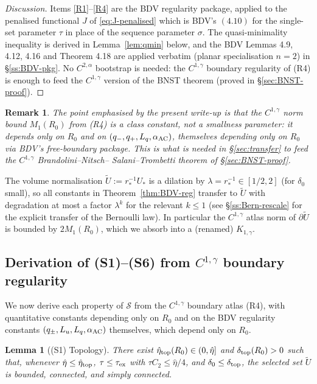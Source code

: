 \documentclass[11pt]{amsart}
\newtheorem{lemma}[theorem]{Lemma}
\newtheorem{remark}[theorem]{Remark}
\newcommand{\Sclass}{\mathcal S}
\newcommand{\wt}{\widetilde}
\begin{document}
\begin{proof}[Discussion]
Items \ref{R1}--\ref{R4} are the BDV regularity package, applied to
the penalised functional $J$ of \eqref{eq:J-penalised} which is BDV's
$(4.10)$ for the single-set parameter $\tau$ in place of the
sequence parameter $\sigma$.  The quasi-minimality inequality is
derived in Lemma~\ref{lem:qmin} below, and the BDV Lemmas 4.9, 4.12,
4.16 and Theorem 4.18 are applied verbatim (planar specialisation
$n=2$) in \S\ref{ss:BDV-pkg}.  No $C^{2,\alpha}$ bootstrap is needed:
the $C^{1,\gamma}$ boundary regularity of (R4) is enough to feed the
$C^{1,\gamma}$ version of the BNST theorem (proved in
\S\ref{sec:BNST-proof}).
\end{proof}

\begin{remark}
The point emphasised by the present write-up is that the
$C^{1,\gamma}$ norm bound $M_1(R_0)$ from (R4) is a \emph{class
constant}, not a smallness parameter: it depends only on $R_0$ and
on $(q_-,q_+,L_q,\alpha_{\rm AC})$, themselves depending only on
$R_0$ via BDV's free-boundary package.  This is what is needed in
\S\ref{sec:transfer} to feed the $C^{1,\gamma}$ Brandolini--Nitsch--
Salani--Trombetti theorem of \S\ref{sec:BNST-proof}.
\end{remark}

The volume normalisation $\wt U:=r_*^{-1}U_*$ is a dilation by
$\lambda=r_*^{-1}\in[1/2,2]$ (for $\delta_0$ small), so all
constants in Theorem~\ref{thm:BDV-reg} transfer to $\wt U$ with
degradation at most a factor $\lambda^{k}$ for the relevant $k\le 1$
(see \S\ref{ss:Bern-rescale} for the explicit transfer of the
Bernoulli law).  In particular the $C^{1,\gamma}$ atlas norm of
$\partial\wt U$ is bounded by $2M_1(R_0)$, which we absorb into a
(renamed) $K_{1,\gamma}$.

\subsection{Derivation of (S1)--(S6) from $C^{1,\gamma}$ boundary
regularity}\label{ss:S-derivation}

We now derive each property of $\Sclass$ from the $C^{1,\gamma}$
boundary atlas (R4), with quantitative constants depending only on
$R_0$ and on the BDV regularity constants $(q_\pm,L_u,L_q,
\alpha_{\rm AC})$ themselves, which depend only on $R_0$.

\begin{lemma}[(S1) Topology]\label{lem:S1}
There exist \(\hat\eta_{\rm top}(R_0)\in(0,\hat\eta]\) and
\(\delta_{\rm top}(R_0)>0\) such that, whenever
\(\hat\eta\le\hat\eta_{\rm top}\),
\(\tau\le\tau_{\rm ex}\) with \(\tau C_2\le\hat\eta/4\), and
\(\delta_0\le\delta_{\rm top}\), the selected set \(\wt U\) is
bounded, connected, and simply connected.
\end{lemma}
\end{document}
